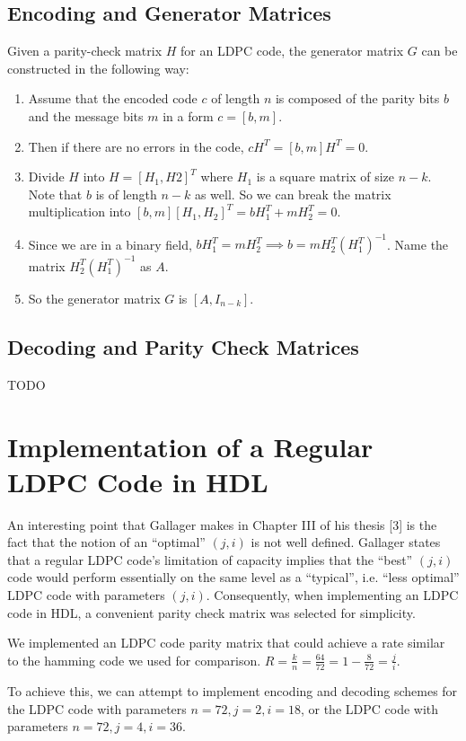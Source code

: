 \documentclass[conference]{IEEEtran}
\begin{document}
\subsection{Encoding and Generator Matrices}
Given a parity-check matrix $H$ for an LDPC code, the generator matrix $G$ can
be constructed in the following way:
\begin{enumerate}
  \item Assume that the encoded code $c$ of length $n$ is composed of the parity bits
        $b$ and the message bits $m$ in a form $c = [b, m]$.
  \item Then if there are no errors in the code, $cH^T = [b, m]H^T = 0$.
  \item Divide $H$ into $H = [H_1, H2]^T$ where $H_1$ is a square matrix of size $n-k$.
        Note that $b$ is of length $n-k$ as well. So we can break the matrix
        multiplication into $[b, m][H_1, H_2]^T = bH_1^T + mH_2^T = 0$.
  \item Since we are in a binary field, $bH_1^T = mH_2^T \implies b =
          mH_2^T(H_1^T)^{-1}$. Name the matrix $H_2^T(H_1^T)^{-1}$ as $A$.
  \item So the generator matrix $G$ is $[A, I_{n-k}]$.
\end{enumerate}

\subsection{Decoding and Parity Check Matrices}
TODO

\section{Implementation of a Regular LDPC Code in HDL}
An interesting point that Gallager makes in Chapter III of his thesis [3] is the fact that the notion of an ``optimal'' $(j,i)$ is not well defined.
Gallager states that a regular LDPC code's limitation of capacity implies that the ``best'' $(j,i)$ code would perform essentially on the same level as a ``typical'', i.e. ``less optimal'' LDPC code with parameters $(j,i)$.
Consequently, when implementing an LDPC code in HDL, a convenient parity check matrix was selected for simplicity.

We implemented an LDPC code parity matrix that could achieve a rate similar to
the hamming code we used for comparison.
$R=\frac{k}{n}=\frac{64}{72}=1-\frac{8}{72} = \frac{j}{i}$.

To achieve this, we can attempt to implement encoding and decoding schemes for
the LDPC code with parameters $n=72, j=2, i=18$, or the LDPC code with
parameters $n=72, j=4, i=36$.
\end{document}
